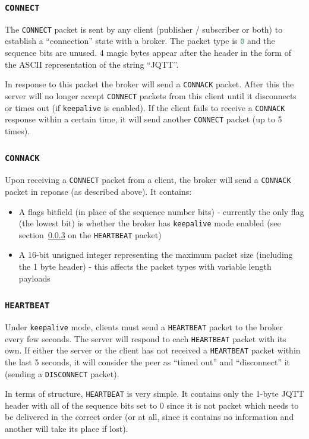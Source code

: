 \documentclass[a4paper]{article}
\numberwithin{figure}{section}
\numberwithin{table}{section}
\newcommand{\mi}{\mintinline}
\begin{document}
\subsubsection{\mi{c}{CONNECT}}
The \mi{c}{CONNECT} packet is sent by any client (publisher / subscriber or both) to establish a ``connection'' state with a broker. The packet type is \mi{c}{0} and the sequence bits are unused. 4 magic bytes appear after the header in the form of the ASCII representation of the string ``JQTT''.

In response to this packet the broker will send a \mi{c}{CONNACK} packet. After this the server will no longer accept \mi{c}{CONNECT} packets from this client until it disconnects or times out (if \mi{c}{keepalive} is enabled). If the client fails to receive a \mi{c}{CONNACK} response within a certain time, it will send another \mi{c}{CONNECT} packet (up to 5 times).

\subsubsection{\mi{c}{CONNACK}}
Upon receiving a \mi{c}{CONNECT} packet from a client, the broker will send a \mi{c}{CONNACK} packet in reponse (as described above). It contains:
\begin{itemize}
	\item A flags bitfield (in place of the sequence number bits) - currently the only flag (the lowest bit) is whether the broker has \mi{c}{keepalive} mode enabled (see section~\ref{sec:heartbeat} on the \mi{c}{HEARTBEAT} packet)
	\item A 16-bit unsigned integer representing the maximum packet size (including the 1 byte header) - this affects the packet types with variable length payloads
\end{itemize}

\subsubsection{\mi{c}{HEARTBEAT}} \label{sec:heartbeat}
Under \mi{c}{keepalive} mode, clients must send a \mi{c}{HEARTBEAT} packet to the broker every few seconds. The server will respond to each \mi{c}{HEARTBEAT} packet with its own. If either the server or the client has not received a \mi{c}{HEARTBEAT} packet within the last 5 seconds, it will consider the peer as ``timed out'' and ``disconnect'' it (sending a \mi{c}{DISCONNECT} packet).

In terms of structure, \mi{c}{HEARTBEAT} is very simple. It contains only the 1-byte JQTT header with all of the sequence bits set to 0 since it is not packet which needs to be delivered in the correct order (or at all, since it contains no information and another will take its place if lost).
\end{document}
